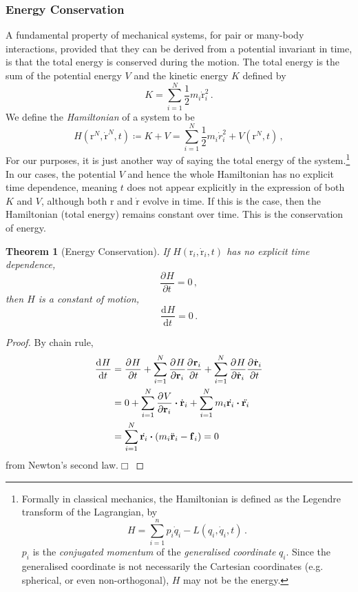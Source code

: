 \documentclass{article}
\theoremstyle{plain}\theoremheaderfont{\normalfont\itshape}\theorembodyfont{\rmfamily}\theoremseparator{.}\newtheorem*{rem}{Remark}\newtheorem*{ex}{Example}\newtheorem*{proof}{Proof}\newtheorem*{altp}{Alternative proof}
\theoremstyle{plain}\theoremheaderfont{\normalfont\bfseries}\theorembodyfont{\rmfamily}\theoremseparator{.}\newtheorem{thm}{Theorem}[section]\newtheorem{lem}[thm]{Lemma}\newtheorem{prop}[thm]{Proposition}\newtheorem*{cor}{Corollary}\newtheorem{defn}[thm]{Definition}\newtheorem{clm}[thm]{Claim}\newtheorem{clminproof}{Claim}\newtheorem{alg}[thm]{Algorithm}\newtheorem{hyp}[thm]{Hypothesis}\newtheorem{law}[thm]{Law}
\theoremstyle{break}\theoremheaderfont{\normalfont\itshape}\theorembodyfont{\rmfamily}\theoremseparator{.\medskip}\newtheorem*{proofskip}{Proof}\newtheorem*{exs}{Examples}\newtheorem*{rems}{Remarks}
\theoremstyle{break}\theoremheaderfont{\normalfont\bfseries}\theorembodyfont{\rmfamily}\theoremseparator{.\medskip}\newtheorem{lemskip}[thm]{Lemma}\newtheorem{defnskip}[thm]{Definition}\newtheorem{propskip}[thm]{Proposition}\newtheorem{thmskip}[thm]{Theorem}
\numberwithin{equation}{section}
\newcommand{\qed}{\hfill\ensuremath{\Box}}
\newcommand{\dv}[3][]{\frac{\mathrm{d}^{#1} #2}{{\mathrm{d} #3}^{#1}}}
\newcommand{\pdv}[3][]{\frac{\partial^{#1} #2}{{\partial #3}^{#1}}}
\newcommand{\vb}[1]{\bm{\mathrm{#1}}}
\newcommand{\vdot}{\bm{\cdot}}
\begin{document}
    \subsubsection*{Energy Conservation}
    A fundamental property of mechanical systems, for pair or many-body interactions, provided that they can be derived from a potential invariant in time, is that the total energy is conserved during the motion. The total energy is the sum of the potential energy \(V\) and the kinetic energy \(K\) defined by
    \begin{equation}
        K=\sum_{i=1}^{N}\frac{1}{2}m_i\vb{\dot{r}}_i^2\,.
    \end{equation}
    We define the \textit{Hamiltonian} of a system to be
    \begin{equation}
        H(\vb{r}^N,\dot{\vb{r}}^N,t)\coloneqq K+V=\sum_{i=1}^{N}\frac{1}{2}m_i\dot{r}_i^2+V(\vb{r}^N,t)\,,
    \end{equation}
    For our purposes, it is just another way of saying the total energy of the system.\footnote{Formally in classical mechanics, the Hamiltonian is defined as the Legendre transform of the Lagrangian, by
    \begin{equation}
        H=\sum_{i=1}^{n}p_i \dot{q}_i-L(q_i,\dot{q}_i,t)\,.
    \end{equation}
    \(p_i\) is the \textit{conjugated momentum} of the \textit{generalised coordinate} \(q_i\). Since the generalised coordinate is not necessarily the Cartesian coordinates (e.g. spherical, or even non-orthogonal), \(H\) may not be the energy.} In our cases, the potential \(V\) and hence the whole Hamiltonian has no explicit time dependence, meaning \(t\) does not appear explicitly in the expression of both \(K\) and \(V\), although both \(\vb{r}\) and \(\dot{\vb{r}}\) evolve in time. If this is the case, then the Hamiltonian (total energy) remains constant over time. This is the conservation of energy.

    \begin{thm}[Energy Conservation]
        If \(H(\vb{r}_i,\dot{\vb{r}}_i,t)\) has no explicit time dependence,
        \begin{equation}
            \pdv{H}{t}=0\,,
        \end{equation}
        then \(H\) is a constant of motion,
        \begin{equation}
            \dv{H}{t}=0\,.
        \end{equation}
    \end{thm}
    \begin{proof}
        By chain rule,
        \begin{align}
            \dv{H}{t}&=\pdv{H}{t}+\sum_{i=1}^{N}\pdv{H}{\vb{r}_i}\pdv{\vb{r}_i}{t}+\sum_{i=1}^{N}\pdv{H}{\dot{\vb{r}}_i}\pdv{\dot{\vb{r}}_i}{t}\notag\\
            &=0+\sum_{i=1}^{N}\pdv{V}{\vb{r}_i}\vdot\dot{\vb{r}}_i+\sum_{i=1}^{N}m_i\dot{\vb{r}_i}\vdot\ddot{\vb{r}_i}\notag\\
            &=\sum_{i=1}^{N}\dot{\vb{r}_i}\vdot\left(m_i\ddot{\vb{r}}_i-\vb{f}_i\right)=0
        \end{align}
        from Newton's second law.\qed
    \end{proof}
\end{document}

